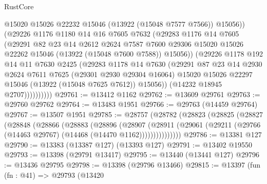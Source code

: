 \begin{lexlean}{RustCore}
\begin{coremodule}
                      @15020
                      @15026
                      @22232
                      @15046
                      (@13922 (@15048 @7577 @7566))
                      @15056))
                  (@29226
                    @1176
                    @1180
                    @14
                    @16
                    @7605
                    @7632
                    (@29283
                      @1176
                      @14
                      @7605
                      (@29291
                        @82
                        @23
                        @14
                        @2612
                        @2624
                        @7587
                        @7600
                        @29306
                        @15020
                        @15026
                        @22262
                        @15046
                        (@13922 (@15048 @7600 @7588))
                        @15056))
                    (@29226
                      @1178
                      @192
                      @14
                      @11
                      @7630
                      @2425
                      (@29283
                        @1178
                        @14
                        @7630
                        (@29291
                          @87
                          @23
                          @14
                          @2930
                          @2624
                          @7611
                          @7625
                          (@29301 @2930 @29304 @16064)
                          @15020
                          @15026
                          @22297
                          @15046
                          (@13922 (@15048 @7625 @7612))
                          @15056))
                      (@14232 @18945 @2707))))))))))
@29761 := @13412 @1162
@29762 := @13609 @29761
@29763 := @29760 @29762
@29764 := @13483 @1951
@29766 := @29763 (@14459 @29764)
@29767 := @13507 @1951
@29785 := @28757
    (@28782
      (@28823
        (@28825
          (@28827
            (@28848
              (@28866
                (@28883
                  (@28896
                    (@28907
                      (@28911
                        (@29061 (@29211 (@29766 (@14463 @29767) (@14468 (@14470 @1162)))))))))))))))
@29786 := @13381 @127
@29790 := @13383 (@13387 @127) (@13393 @127)
@29791 := @13402 @19550
@29793 := @13398 (@29791 @13417)
@29795 := @13440 (@13441 @127)
@29796 := @13436 @29795
@29798 := @13398 (@29796 @13466)
@29815 := @13397
    (fun (fn : @41) =>
    @29793
      (@13420

\end{coremodule}
\end{lexlean}
